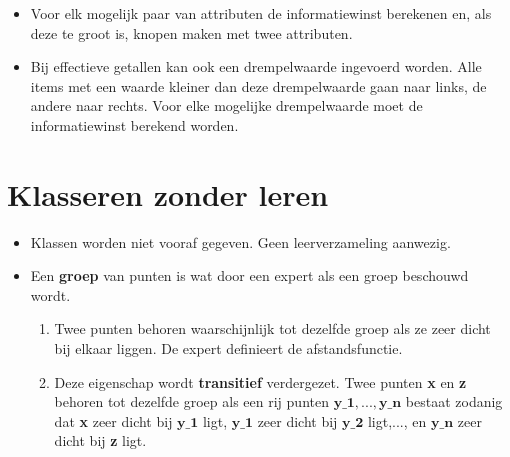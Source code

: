 \begin{itemize}
\begin{itemize}
\begin{itemize}
\begin{itemize}
						\item Voor elk mogelijk paar van attributen de informatiewinst berekenen en, als deze te groot is, knopen maken met twee attributen.
						\item Bij effectieve getallen kan ook een drempelwaarde ingevoerd worden. Alle items met een waarde kleiner dan deze drempelwaarde gaan naar links, de andere naar rechts. Voor elke mogelijke drempelwaarde moet de informatiewinst berekend worden.
					\end{itemize}
				\end{itemize}
			\end{itemize}
			
		\end{itemize}

\section{Klasseren zonder leren}
\begin{itemize}
	\item Klassen worden niet vooraf gegeven.
	\alert Geen leerverzameling aanwezig.
	\item Een \textbf{groep} van punten is wat door een expert als een groep beschouwd wordt.
	\begin{enumerate}
		\item Twee punten behoren waarschijnlijk tot dezelfde groep als ze zeer dicht bij elkaar liggen. De expert definieert de afstandsfunctie.
		\item Deze eigenschap wordt \textbf{transitief} verdergezet. Twee punten \textbf{x} en \textbf{z} behoren tot dezelfde groep als een rij punten $\textbf{y_1},...,\textbf{y_n}$ bestaat zodanig dat \textbf{x} zeer dicht bij $\textbf{y_1}$ ligt, $\textbf{y_1}$ zeer dicht bij $\textbf{y_2}$ ligt,..., en $\textbf{y_n}$ zeer dicht bij \textbf{z} ligt. 
	\end{enumerate}
\end{itemize}
